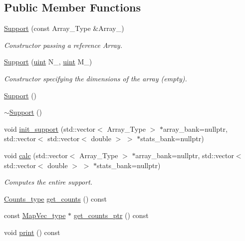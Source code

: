 \subsection*{Public Member Functions}
\begin{DoxyCompactItemize}
\item 
\hyperlink{classbarry_1_1_support_a094ac08cd4cd58c9b2dd5043cf2cdd13}{Support} (const Array\+\_\+\+Type \&Array\+\_\+)
\begin{DoxyCompactList}\small\item\em Constructor passing a reference Array. \end{DoxyCompactList}\item 
\hyperlink{classbarry_1_1_support_a0deea9b8e83fd418dfad59fb4cfb2ad5}{Support} (\hyperlink{namespacebarry_a11dfc53ddb4672278319aa04f1e09a6c}{uint} N\+\_\+, \hyperlink{namespacebarry_a11dfc53ddb4672278319aa04f1e09a6c}{uint} M\+\_\+)
\begin{DoxyCompactList}\small\item\em Constructor specifying the dimensions of the array (empty). \end{DoxyCompactList}\item 
\hyperlink{classbarry_1_1_support_a08a48546e91c5259a26be4cde31ef902}{Support} ()
\item 
\hyperlink{classbarry_1_1_support_a4ea99cc1691b04b76a333e851aab4b64}{$\sim$\+Support} ()
\item 
void \hyperlink{classbarry_1_1_support_a013872a55ffd6a0a931e124da8e8dc99}{init\+\_\+support} (std\+::vector$<$ Array\+\_\+\+Type $>$ $\ast$array\+\_\+bank=nullptr, std\+::vector$<$ std\+::vector$<$ double $>$ $>$ $\ast$stats\+\_\+bank=nullptr)
\item 
void \hyperlink{classbarry_1_1_support_afa36b8c1348e28c51296379157f58081}{calc} (std\+::vector$<$ Array\+\_\+\+Type $>$ $\ast$array\+\_\+bank=nullptr, std\+::vector$<$ std\+::vector$<$ double $>$ $>$ $\ast$stats\+\_\+bank=nullptr)
\begin{DoxyCompactList}\small\item\em Computes the entire support. \end{DoxyCompactList}\item 
\hyperlink{namespacebarry_a3e2d8c3b6cf602107559d4237d9f1315}{Counts\+\_\+type} \hyperlink{classbarry_1_1_support_a5d93a94eaed9b1157fb934284883fd47}{get\+\_\+counts} () const
\item 
const \hyperlink{namespacebarry_a2f0d3aab1d67e4c8eaeab9022e16139f}{Map\+Vec\+\_\+type} $\ast$ \hyperlink{classbarry_1_1_support_abcb4dea3c5a1b140990821900432f90e}{get\+\_\+counts\+\_\+ptr} () const
\item 
void \hyperlink{classbarry_1_1_support_af87b2e85ec72e394387946023508e7fd}{print} () const
\end{DoxyCompactItemize}
